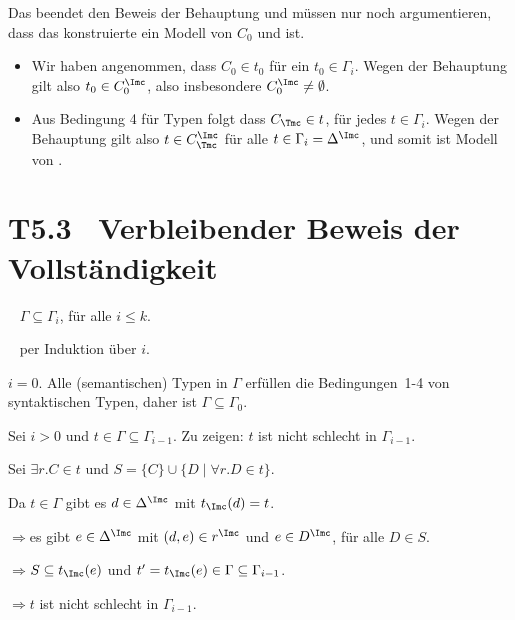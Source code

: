 \documentclass[fontsize=11pt, twoside=false, numbers=autoenddot]{scrbook}
\begin{document}
Das beendet den Beweis der Behauptung und müssen nur noch
argumentieren, dass das konstruierte \Imc ein Modell von $C_0$ und
\Tmc ist. 
%
\begin{itemize}

  \item Wir haben angenommen, dass $C_0\in t_0$ für ein
    $t_0\in\Gamma_i$. Wegen der Behauptung gilt also $t_0\in
    C_0^\Imc$, also insbesondere $C_0^\Imc\neq \emptyset$.

  \item Aus Bedingung 4 für Typen folgt dass $C_\Tmc\in t$, für jedes
    $t\in \Gamma_i$. Wegen der Behauptung gilt also $t\in C_\Tmc^\Imc$
    für alle $t\in \Gamma_i=\Delta^\Imc$, 
    und somit ist \Imc Modell von \Tmc.
    \qedhere

\end{itemize}

\section*{T5.3~ Verbleibender Beweis der Vollständigkeit}

~
$\Gamma\subseteq \Gamma_i$,
für alle $i\leq k$.

\parII
{}~
per Induktion über $i$.

\parI
{} $i=0$. Alle
(semantischen) Typen in $\Gamma$ erfüllen die Bedingungen~1-4 von
syntaktischen Typen, daher ist $\Gamma\subseteq \Gamma_0$.

\smallskip
{} Sei $i>0$ und $t\in \Gamma\subseteq
\Gamma_{i-1}$.  Zu zeigen: $t$ ist nicht schlecht in $\Gamma_{i-1}$. 

\smallskip

Sei $\exists r.C\in t$ und $S=\{C\}\cup\{D\mid \forall r.D\in t\}$. 

Da $t\in\Gamma$ gibt es $d\in\Delta^\Imc$ mit $t_\Imc(d)=t$. 

$\Rightarrow$\quad es gibt $e\in\Delta^\Imc$ mit $(d,e)\in r^\Imc$ und $e\in D^\Imc$, für alle $D\in S$. 

$\Rightarrow$\quad $S\subseteq t_\Imc(e)$ und
$t'=t_\Imc(e)\in \Gamma\subseteq\Gamma_{i-1}$. 

$\Rightarrow$\quad $t$ ist nicht schlecht in $\Gamma_{i-1}$.
\qedhere
\end{document}
